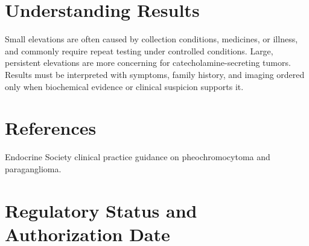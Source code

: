 \section*{Understanding Results}
Small elevations are often caused by collection conditions, medicines, or illness, and commonly require repeat testing under controlled conditions. Large, persistent elevations are more concerning for catecholamine-secreting tumors. Results must be interpreted with symptoms, family history, and imaging ordered only when biochemical evidence or clinical suspicion supports it.

\section*{References}
Endocrine Society clinical practice guidance on pheochromocytoma and paraganglioma.

\clearpage


\section*{Regulatory Status and Authorization Date}

\clearpage
